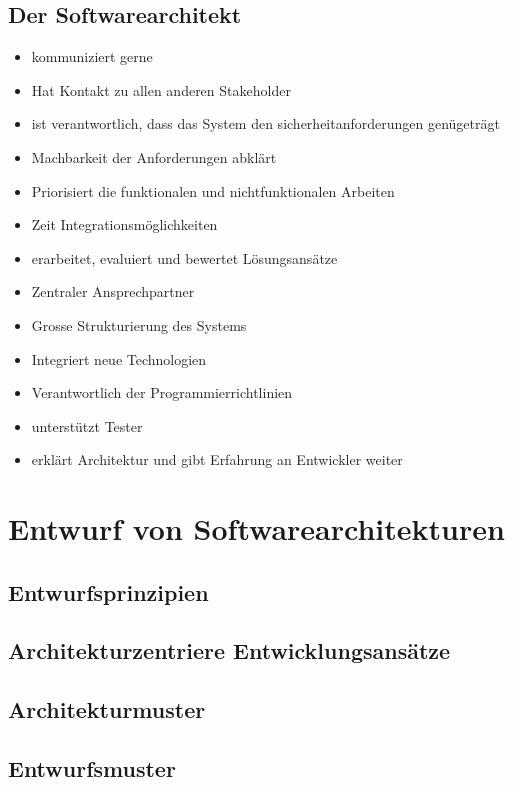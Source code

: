 \documentclass{report}
\theoremstyle{definition}
\theoremstyle{example}
\begin{document}
\subsection{Der Softwarearchitekt}
\begin{itemize}
   \item kommuniziert gerne 
   \item Hat Kontakt zu allen anderen Stakeholder
   \item ist verantwortlich, dass das System den sicherheitanforderungen genügeträgt
   \item Machbarkeit der Anforderungen abklärt
   \item Priorisiert die funktionalen und nichtfunktionalen Arbeiten
   \item Zeit Integrationsmöglichkeiten
   \item erarbeitet, evaluiert und bewertet Lösungsansätze
   \item Zentraler Ansprechpartner
   \item Grosse Strukturierung des Systems
   \item Integriert neue Technologien
   \item Verantwortlich der Programmierrichtlinien
   \item unterstützt Tester
   \item erklärt Architektur und gibt Erfahrung an Entwickler weiter
\end{itemize}

\section{Entwurf von Softwarearchitekturen}

\subsection{Entwurfsprinzipien}


\subsection{Architekturzentriere Entwicklungsansätze}


\subsection{Architekturmuster}


\subsection{Entwurfsmuster}
\end{document}
